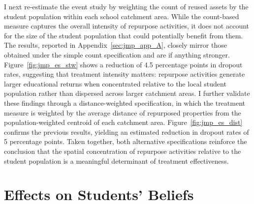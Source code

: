 \documentclass[12pt]{article}
\theoremstyle{plain}
\theoremstyle{plain}
\theoremstyle{plain}
\theoremstyle{definition}
\theoremstyle{plain}
\theoremstyle{definition}
\theoremstyle{plain}
\theoremstyle{remark}
\theoremstyle{definition}
\theoremstyle{definition}
\theoremstyle{plain}
\begin{document}
 I next re-estimate the event study by weighting the count of reused assets by the student population within each school catchment area. While the count-based measure captures the overall intensity of repurpose activities, it does not account for the size of the student population that could potentially benefit from them. 
The results, reported in Appendix~\ref{sec:jmp_app_A}, closely mirror those obtained under the simple count specification and are if anything stronger. Figure~\ref{fig:jmp_es_stw} shows a reduction of 4.5 percentage points in dropout rates, suggesting that treatment intensity matters: repurpose activities generate larger educational returns when concentrated relative to the local student population rather than dispersed across larger catchment areas.
I further validate these findings through a distance-weighted specification, in which the treatment measure is weighted by the average distance of repurposed properties from the population-weighted centroid of each catchment area. Figure~\ref{fig:jmp_es_dist} confirms the previous results, yielding an estimated reduction in dropout rates of 5 percentage points. Taken together, both alternative specifications reinforce the conclusion that the spatial concentration of repurpose activities relative to the student population is a meaningful determinant of treatment effectiveness. \par

    
\FloatBarrier
\section{Effects on Students' Beliefs}
\label{sec:jmp_mechanisms}
\end{document}

